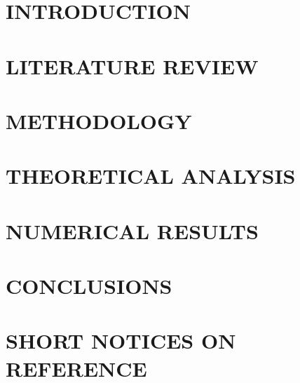 \documentclass[a4paper,13pt,3p,twoside]{report}
\begin{document}

\pagestyle{empty}

\newpage


\newpage


\newpage
{}

\tableofcontents 
\thispagestyle{empty}
\cleardoublepage

\renewcommand{\listfigurename}{LIST OF FIGURES}
{\let\oldnumberline\numberline
\renewcommand{\numberline}{Figure~\oldnumberline}
\listoffigures} 
\newpage

\renewcommand{\listtablename}{LIST OF TABLES}
{\let\oldnumberline\numberline
\renewcommand{\numberline}{Table~\oldnumberline}
\listoftables}

\glsaddall 
\renewcommand*{\acronymname}{LIST OF ABBREVIATIONS}
\renewcommand*{\entryname}{Abbreviation}
\renewcommand*{\descriptionname}{Definition}
\printnoidxglossaries

\renewcommand\appendixname{APPENDIX}
\renewcommand\appendixpagename{APPENDIX}
\renewcommand\appendixtocname{APPENDIX}

\renewcommand{\figurename}{Figure}
\renewcommand{\tablename}{Table}
\renewcommand{\chaptername}{CHAPTER}

\newpage
{}
\pagestyle{fancy}
\fancyhf{}
\fancyhead[RE, LO]{\leftmark}
\fancyfoot[RE, LO]{\thepage}

\chapter{INTRODUCTION}




\newpage
\chapter{LITERATURE REVIEW}


\newpage
\chapter{METHODOLOGY}


\newpage
\chapter{THEORETICAL ANALYSIS}


\newpage
\chapter{NUMERICAL RESULTS}


\newpage
\chapter{CONCLUSIONS}


\newpage
\chapter*{SHORT NOTICES ON REFERENCE}
\label{chapter:reference}

\end{document}
